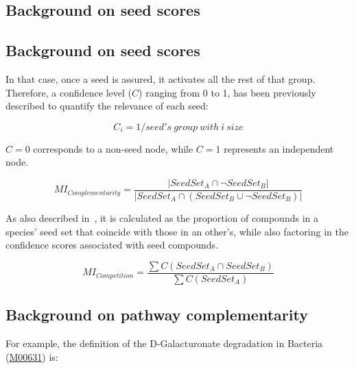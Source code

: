\documentclass[sn-mathphys,Numbered]{sn-jnl}%
\theoremstyle{thmstyleone}%
\theoremstyle{thmstyletwo}%
\theoremstyle{thmstylethree}%
\begin{document}
\begin{appendices}

    \section{Background on seed scores}
    \label{secA1}


        \subsection{Background on seed scores}

            In that case, once a seed is assured, it activates all the rest of that group.
            Therefore, a confidence level ($C$) ranging from 0 to 1, has been previously described to quantify the relevance of each seed:

            \begin{equation}
                \label{eq:confidence}
                C_i = 1 / seed's\ group\ with \ i \ size
            \end{equation}

            $C=0$ corresponds to a non-seed node, while $C=1$ represents an independent node. 



            \begin{equation}
                \label{eq:mi_complementarity}
                MI_{Complementarity} = \frac{ | SeedSet_A \cap \neg SeedSet_B | }{ | SeedSet_A \cap (SeedSet_B \cup \neg SeedSet_B) | }
            \end{equation}


            As also described in~\cite{phylomint_ms}, it is calculated as the proportion of compounds in a species' seed set that coincide with those in an other's, while also factoring in the confidence scores associated with seed compounds.

            \begin{equation}
                \label{eq:mi_competition}
                MI_{Competition} = \frac{ \sum C (SeedSet_A \cap SeedSet_B) }{ \sum{ C (SeedSet_A )} }
            \end{equation}




        \subsection{Background on pathway complementarity}

            For example, the definition of the D-Galacturonate degradation in Bacteria (\href{https://www.genome.jp/dbget-bin/www_bget?M00631}{M00631}) is: \vspace{0.35cm}



\end{appendices}
\end{document}
